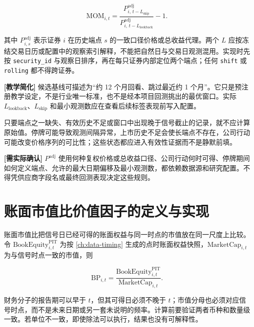 \begin{equation}
  \mathrm{MOM}_{i,t}
  =
  \frac{
    P^{\mathrm{adj}}_{i,\,t-L_{\mathrm{skip}}}
  }{
    P^{\mathrm{adj}}_{i,\,t-L_{\mathrm{lookback}}}
  }
  - 1 .
  \label{eq:ch04-momentum}
\end{equation}

其中 \(P^{\mathrm{adj}}_{i,s}\) 表示证券 \(i\) 在历史端点 \(s\) 的一致口径价格或总收益代理。两个 \(L\) 应按冻结交易日历或配置中的观察索引解释，不能把自然日与交易日观测混用。实现时先按 \texttt{security\_id} 与观察日排序，再在每只证券内部定位两个端点；任何 \texttt{shift} 或 \texttt{rolling} 都不得跨证券。

\begin{teachingbox}
\textbf{[教学简化]} 候选基线可描述为“约 12 个月回看、跳过最近约 1 个月”。它只是预注册教学设定，不是行业唯一标准，也不是经本项目回测挑出的最优窗口。实际 \(L_{\mathrm{lookback}}\)、\(L_{\mathrm{skip}}\) 和最小观测数应在查看后续标签表现前写入配置。
\end{teachingbox}

只要端点之一缺失、有效历史不足或窗口中出现晚于信号截止的记录，就不应计算原始值。停牌可能导致观测间隔异常，上市历史不足会使长端点不存在，公司行动可能改变价格序列的可比性；这些状态都应进入有效性证据而不是静默前填。

\begin{confirmbox}
\textbf{[需实际确认]} \(P^{\mathrm{adj}}\) 使用何种复权价格或总收益口径、公司行动何时可得、停牌期间如何定义端点、允许的最大日期偏移及最小观测数，都依赖数据源和研究配置。不得凭供应商字段名或最终回测表现决定这些规则。
\end{confirmbox}

\section{账面市值比价值因子的定义与实现}

账面市值比把信号日已经可得的账面权益与同一时点的市值放在同一尺度上比较。令
\(\mathrm{BookEquity}^{\mathrm{PIT}}_{i,t}\) 为按 \cref{ch:data-timing} 生成的点时账面权益快照，\(\mathrm{MarketCap}_{i,t}\) 为与信号时点一致的市值，则

\begin{equation}
  \mathrm{BP}_{i,t}
  =
  \frac{
    \mathrm{BookEquity}^{\mathrm{PIT}}_{i,t}
  }{
    \mathrm{MarketCap}_{i,t}
  } .
  \label{eq:ch04-book-to-price}
\end{equation}

财务分子的报告期可以早于 \(t\)，但其可得日必须不晚于 \(t\)；市值分母也必须对应信号时点，而不是未来日期或另一套未说明的频率。计算前要验证两者币种和数量级一致。若单位不一致，即使除法可以执行，结果也没有可解释性。


